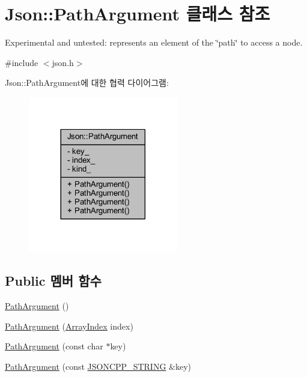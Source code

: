 \hypertarget{class_json_1_1_path_argument}{}\section{Json\+:\+:Path\+Argument 클래스 참조}
\label{class_json_1_1_path_argument}


Experimental and untested\+: represents an element of the \char`\"{}path\char`\"{} to access a node.  




{\ttfamily \#include $<$json.\+h$>$}



Json\+:\+:Path\+Argument에 대한 협력 다이어그램\+:\nopagebreak
\begin{figure}[H]
\begin{center}
\leavevmode
\includegraphics[width=185pt]{class_json_1_1_path_argument__coll__graph}
\end{center}
\end{figure}
\subsection*{Public 멤버 함수}
\begin{DoxyCompactItemize}
\item 
\hyperlink{class_json_1_1_path_argument_a3c96ed20c56a55eb76d37a11553c528e}{Path\+Argument} ()
\item 
\hyperlink{class_json_1_1_path_argument_a53c5b27143b161301b95fd544c139ecf}{Path\+Argument} (\hyperlink{namespace_json_a8048e741f2177c3b5d9ede4a5b8c53c2}{Array\+Index} index)
\item 
\hyperlink{class_json_1_1_path_argument_a9690417a8a40e6e49f2acdf6c9281345}{Path\+Argument} (const char $\ast$key)
\item 
\hyperlink{class_json_1_1_path_argument_ac15f25452124fbf21218897113015301}{Path\+Argument} (const \hyperlink{json_8h_a1e723f95759de062585bc4a8fd3fa4be}{J\+S\+O\+N\+C\+P\+P\+\_\+\+S\+T\+R\+I\+NG} \&key)
\end{DoxyCompactItemize}
